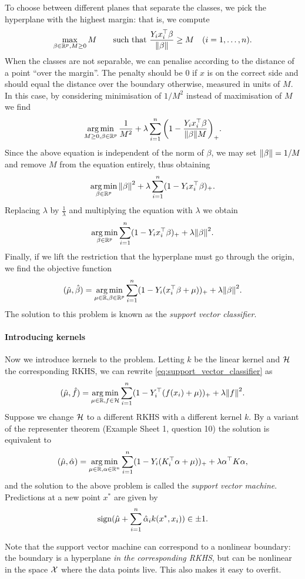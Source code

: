 To choose between different planes that separate the classes, we pick the hyperplane with the highest margin: that is, we compute
\[
\max_{\beta \in \mathbb R^p, M \geq 0} M \qquad\text{such that } \frac{Y_i x_i^\top\beta}{\norm{\beta}} \geq M \quad (i = 1,\dotsc, n). 
\]
When the classes are not separable, we can penalise according to the distance of a point ``over the margin''. The penalty should be 0 if $x$ is on the correct side and should equal the distance over the boundary otherwise, measured in units of $M$. In this case, by considering minimisation of $1/M^2$ instead of maximisation of $M$ we find
\[
\operatorname*{arg\,min}_{M \geq 0, \beta \in \mathbb R^p} \frac1{M^2} + \lambda \sum_{i=1}^n \qty(1 - \frac{Y_i x_i^\top \beta}{\norm{\beta} M})_+. 
\]
Since the above equation is independent of the norm of $\beta$, we may set $\norm{\beta} = 1/M$ and remove $M$ from the equation entirely, thus obtaining
\[
\operatorname*{arg\,min}_{\beta \in \mathbb R^p} \norm{\beta}^2 + \lambda \sum_{i=1}^n (1 - Y_i x_i^\top \beta)_+.
\]
Replacing $\lambda$ by $\frac1\lambda$ and multiplying the equation with $\lambda$ we obtain
\[
\operatorname*{arg\,min}_{\beta \in \mathbb R^p} \sum_{i=1}^n (1 - Y_i x_i^\top \beta)_+ + \lambda \norm{\beta}^2. 
\]
Finally, if we lift the restriction that the hyperplane must go through the origin, we find the objective function
\begin{equation} \label{eq:support_vector_classifier}
(\hat \mu, \hat\beta) = \operatorname*{arg\,min}_{\mu \in \mathbb R, \beta \in \mathbb R^p} \sum_{i=1}^n (1 - Y_i (x_i^\top\beta + \mu))_+ + \lambda  \norm{\beta}^2. 
\end{equation}
The solution to this problem is known as the \emph{support vector classifier}.  

\paragraph{Introducing kernels}
Now we introduce kernels to the problem. Letting $k$ be the linear kernel and $\mathcal H$ the corresponding RKHS, we can rewrite \cref{eq:support_vector_classifier} as
\[
(\hat \mu, \hat f) = \operatorname*{arg\,min}_{\mu \in \mathbb R, f \in \mathcal H} \sum_{i=1}^n (1 - Y_i^\top (f(x_i) + \mu))_+ + \lambda \norm{f}^2.
\]
Suppose we change $\mathcal H$ to a different RKHS with a different kernel $k$. By a variant of the representer theorem (Example Sheet 1, question 10) the solution is equivalent to
\[
(\hat\mu, \hat\alpha) = \operatorname*{arg\,min}_{\mu \in \mathbb R, \alpha \in \mathbb R^n} \sum_{i=1}^n (1 - Y_i (K_i^\top \alpha + \mu))_+ + \lambda \alpha^\top K\alpha, 
\]
and the solution to the above problem is called the \emph{support vector machine}.  Predictions at a new point $x^*$ are given by
\[
\operatorname{sign}(\hat\mu + \sum_{i=1}^n \hat\alpha_i k(x^*, x_i)) \in \pm 1. 
\]
\begin{remark}
Note that the support vector machine can correspond to a nonlinear boundary: the boundary is a hyperplane \emph{in the corresponding RKHS}, but can be nonlinear in the space $\mathcal X$ where the data points live. This also makes it easy to overfit. 
\end{remark}

